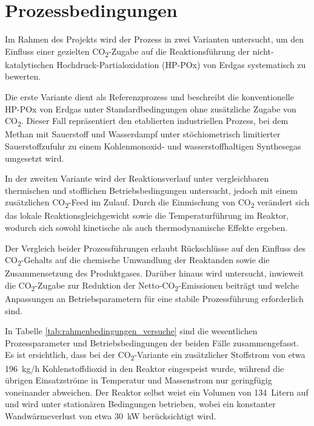     \section{Prozessbedingungen}
        Im Rahmen des Projekts wird der Prozess in zwei Varianten untersucht, um den Einfluss einer gezielten CO\textsubscript{2}-Zugabe auf die Reaktionsführung der nicht-katalytischen Hochdruck-Partialoxidation (HP-POx) von Erdgas systematisch zu bewerten. 
        
        Die erste Variante dient als Referenzprozess und beschreibt die konventionelle HP-POx von Erdgas unter Standardbedingungen ohne zusätzliche Zugabe von CO\textsubscript{2}. Dieser Fall repräsentiert den etablierten industriellen Prozess, bei dem Methan mit Sauerstoff und Wasserdampf unter stöchiometrisch limitierter Sauerstoffzufuhr zu einem Kohlenmonoxid- und wasserstoffhaltigen Synthesegas umgesetzt wird. 
        
        In der zweiten Variante wird der Reaktionsverlauf unter vergleichbaren thermischen und stofflichen Betriebsbedingungen untersucht, jedoch mit einem zusätzlichen CO\textsubscript{2}-Feed im Zulauf. Durch die Einmischung von CO\textsubscript{2} verändert sich das lokale Reaktionsgleichgewicht sowie die Temperaturführung im Reaktor, wodurch sich sowohl kinetische als auch thermodynamische Effekte ergeben. 
        
        Der Vergleich beider Prozessführungen erlaubt Rückschlüsse auf den Einfluss des CO\textsubscript{2}-Gehalts auf die chemische Umwandlung der Reaktanden sowie die Zusammensetzung des Produktgases. Darüber hinaus wird untersucht, inwieweit die CO\textsubscript{2}-Zugabe zur Reduktion der Netto-CO\textsubscript{2}-Emissionen beiträgt und welche Anpassungen an Betriebsparametern für eine stabile Prozessführung erforderlich sind.  
        
        In Tabelle \ref{tab:rahmenbedingungen_versuche} sind die wesentlichen Prozessparameter und Betriebsbedingungen der beiden Fälle zusammengefasst. Es ist ersichtlich, dass bei der CO\textsubscript{2}-Variante ein zusätzlicher Stoffstrom von etwa 196~kg/h Kohlenstoffdioxid in den Reaktor eingespeist wurde, während die übrigen Einsatzströme in Temperatur und Massenstrom nur geringfügig voneinander abweichen. Der Reaktor selbst weist ein Volumen von  134~Litern auf und wird unter stationären Bedingungen betrieben, wobei ein konstanter Wandwärmeverlust von etwa 30~kW berücksichtigt wird.
        
